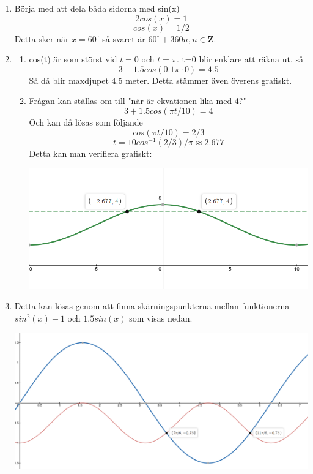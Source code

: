 \documentclass[a4paper,12pt]{article}
\begin{document}
\begin{enumerate}
      \item Börja med att dela båda sidorna med sin(x)
            $$2cos(x)=1$$
            $$cos(x)=1/2$$
            Detta sker när $x=60^\circ$ så svaret är $60^\circ + 360n, n \in \mathbf{Z}$.

      \item \begin{enumerate}
                  \item cos(t) är som störst vid $t=0$ och $t=\pi$. t=0 blir enklare
                        att räkna ut, så
                        $$3+1.5cos(0.1\pi \cdot 0)=4.5$$
                        Så då blir maxdjupet 4.5 meter. Detta stämmer även överens grafiskt.
                  \item Frågan kan ställas om till "när är ekvationen lika med 4?"
                        $$3+1.5cos(\pi t/10)=4$$
                        Och kan då lösas som följande
                        $$cos(\pi t/10)=2/3$$
                        $$t=10cos^{-1}(2/3)/\pi \approx 2.677$$
                        Detta kan man verifiera grafiskt:

                        \includegraphics[scale=0.55]{Figur4.png}

            \end{enumerate}

      \item Detta kan lösas genom att finna skärningspunkterna mellan
            funktionerna $sin^2(x)-1$ och $1.5sin(x)$ som visas nedan.

            \includegraphics[scale=0.45]{Figur5.png}


\end{enumerate}
\end{document}

